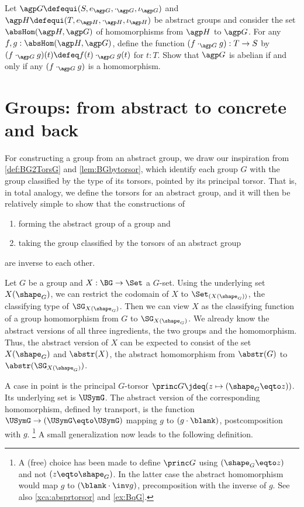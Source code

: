 \begin{xca}\label{xca:abs-homgroup}
Let $\agp G\defequi(S,e_{\agp G},\cdot_{\agp G},\iota_{\agp G})$
and $\agp H\defequi(T,e_{\agp H},\cdot_{\agp H},\iota_{\agp H})$
be abstract groups and consider the set $\absHom(\agp H,\agp G)$
of homomorphisms from $\agp H$ to $\agp G$.
For any $f,g: \absHom(\agp H,\agp G)$, define
the function $(f\cdot_{\agp G}g): T\to S$
by $(f\cdot_{\agp G}g)(t)\defeq f(t)\cdot_{\agp G}g(t)$ for $t:T$.
Show that $\agp G$ is abelian if and only if
any $(f\cdot_{\agp G}g)$ is a homomorphism.
\end{xca}

\section{Groups: from abstract to concrete and back}
\label{sec:Gsetforabstract}

For constructing a group from an abstract group, we draw our inspiration
from \cref{def:BG2TorsG} and \cref{lem:BGbytorsor},
which identify each group $G$ with the group classified by
the type of its torsors, pointed by its principal torsor.
That is, in total analogy, we define the torsors for an abstract group,
and it will then be relatively simple to show that the constructions of
\begin{enumerate}
\item forming the abstract group of a group and
\item taking the group classified by the torsors of an abstract group
\end{enumerate}
 are inverse to each other.

Let $G$ be a group and $X:\BG\to\Set$ a $G$-set. Using the
underlying set $X(\sh_G)$, we can restrict the
codomain of $X$ to $\Set_{(X(\sh_G))}$, the classifying type of 
$\SG_{X(\sh_G)}$. Then we can view $X$ as the classifying function of 
a group homomorphism from $G$ to $\SG_{X(\sh_G)}$.
We already know the abstract versions of all three ingredients,
the two groups and the homomorphism. Thus, the abstract version
of $X$ can be expected to consist of the set $X(\sh_G)$ and 
$\abstr(X)$, the abstract homomorphism from $\abstr(G)$ 
to $\abstr(\SG_{X(\sh_G)})$.

A case in point is the principal $G$-torsor $\princ G \jdeq
(z\mapsto (\sh_G\eqto z))$. Its underlying set is $\USymG$.
The abstract version of the corresponding homomorphism,
defined by transport, is the function $\USymG\to(\USymG\eqto\USymG)$
mapping $g$ to $(g\cdot\blank)$, \ie postcomposition with $g$.%
\footnote{\label{ft:choicePshG}A (free) choice has been made to define 
$\princ G$ using $(\sh_G\eqto z)$ and not $(z\eqto\sh_G)$. In the latter
case the abstract homomorphism would map $g$ to $(\blank\cdot\inv g)$, \ie
precomposition with the inverse of $g$. See also \cref{xca:absprtorsor}
and \cref{ex:BqG}.}
A small generalization now leads to the following definition.

